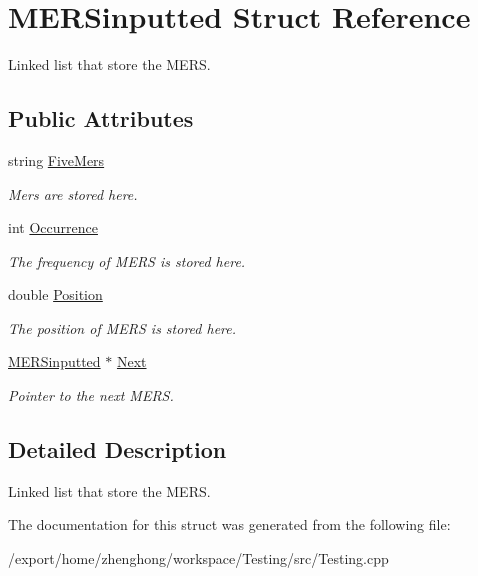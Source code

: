 \hypertarget{struct_m_e_r_sinputted}{\section{M\+E\+R\+Sinputted Struct Reference}
\label{struct_m_e_r_sinputted}
}


Linked list that store the M\+E\+R\+S.  


\subsection*{Public Attributes}
\begin{DoxyCompactItemize}
\item 
\hypertarget{struct_m_e_r_sinputted_aef4c8be2241a687b3f40c121d6ccca8d}{string \hyperlink{struct_m_e_r_sinputted_aef4c8be2241a687b3f40c121d6ccca8d}{Five\+Mers}}\label{struct_m_e_r_sinputted_aef4c8be2241a687b3f40c121d6ccca8d}

\begin{DoxyCompactList}\small\item\em Mers are stored here. \end{DoxyCompactList}\item 
\hypertarget{struct_m_e_r_sinputted_af8d8598fb8fcfff608f19f7630e5f76c}{int \hyperlink{struct_m_e_r_sinputted_af8d8598fb8fcfff608f19f7630e5f76c}{Occurrence}}\label{struct_m_e_r_sinputted_af8d8598fb8fcfff608f19f7630e5f76c}

\begin{DoxyCompactList}\small\item\em The frequency of M\+E\+R\+S is stored here. \end{DoxyCompactList}\item 
\hypertarget{struct_m_e_r_sinputted_ab020e878150f221ce890822d782c342f}{double \hyperlink{struct_m_e_r_sinputted_ab020e878150f221ce890822d782c342f}{Position}}\label{struct_m_e_r_sinputted_ab020e878150f221ce890822d782c342f}

\begin{DoxyCompactList}\small\item\em The position of M\+E\+R\+S is stored here. \end{DoxyCompactList}\item 
\hypertarget{struct_m_e_r_sinputted_ae10ac7356ca4f3c8229e15d0c8fc2a3b}{\hyperlink{struct_m_e_r_sinputted}{M\+E\+R\+Sinputted} $\ast$ \hyperlink{struct_m_e_r_sinputted_ae10ac7356ca4f3c8229e15d0c8fc2a3b}{Next}}\label{struct_m_e_r_sinputted_ae10ac7356ca4f3c8229e15d0c8fc2a3b}

\begin{DoxyCompactList}\small\item\em Pointer to the next M\+E\+R\+S. \end{DoxyCompactList}\end{DoxyCompactItemize}


\subsection{Detailed Description}
Linked list that store the M\+E\+R\+S. 

The documentation for this struct was generated from the following file\+:\begin{DoxyCompactItemize}
\item 
/export/home/zhenghong/workspace/\+Testing/src/Testing.\+cpp\end{DoxyCompactItemize}
